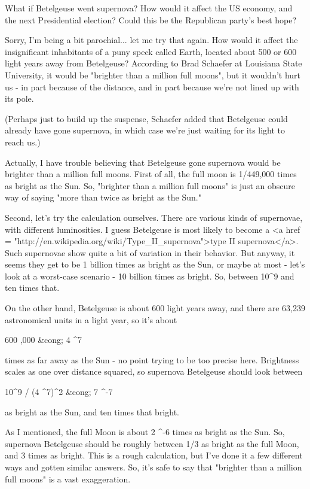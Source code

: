 What if Betelgeuse went supernova?  How would it affect the US
economy, and the next Presidential election?  Could this be the
Republican party's best hope?

Sorry, I'm being a bit parochial... let me try that again.  How would
it affect the insignificant inhabitants of a puny speck called Earth,
located about 500 or 600 light years away from Betelgeuse?  According
to Brad Schaefer at Louisiana State University, it would be "brighter
than a million full moons", but it wouldn't hurt us - in part because of
the distance, and in part because we're not lined up with its pole.

(Perhaps just to build up the suspense, Schaefer added that Betelgeuse
could already have gone supernova, in which case we're just waiting
for its light to reach us.)

Actually, I have trouble believing that Betelgeuse gone supernova
would be brighter than a million full moons.  First of all,
the full moon is 1/449,000 times as bright as the Sun.  So, 
"brighter than a million full moons" is just an obscure
way of saying "more than twice as bright as the Sun."

Second, let's try the calculation ourselves.  There are various
kinds of supernovae, with different luminosities.   I guess 
Betelgeuse is most likely to become a 
<a href = "http://en.wikipedia.org/wiki/Type_II_supernova">type II 
supernova</a>.   Such supernovae show quite a bit of variation
in their behavior.  But anyway, it seems they get to be
1 billion times as bright as the Sun, or maybe at most - let's look at a
worst-case scenario - 10 billion times as bright.  
So, between 10^{9} and ten times that.

On the other hand, Betelgeuse is about 600 light years away, 
and there are 63,239 astronomical units in a light year,
so it's about

600 ,000 &cong; 4 ^{7}

times as far away as the Sun - no point trying to be too precise
here.   Brightness scales as one over distance squared, so 
supernova Betelgeuse should look between

10^{9} / (4 ^{7})^{2} &cong; 
7 ^{-7}

as bright as the Sun, and ten times that bright.  

As I mentioned, the full Moon is about 2 ^{-6}
times as bright as the Sun.  So, supernova Betelgeuse should be
roughly between 1/3 as bright as the full Moon, and 3 times as bright.
This is a rough calculation, but I've done it a few different ways
and gotten similar answers.  So, it's safe to say that 
"brighter than a million full moons" is a vast
exaggeration.

